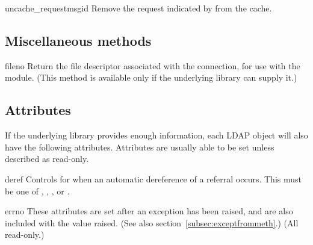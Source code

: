 
\begin{methoddesc}{uncache_request}{msgid}
Remove the request indicated by  from the cache.
\end{methoddesc}


\subsection{Miscellaneous methods}

\begin{methoddesc}{fileno}{}
Return the file descriptor associated with the connection, for use
with the  module.
(This method is available only if the underlying library can supply it.)
\end{methoddesc}


\subsection{Attributes}

If the underlying library provides enough information,
each LDAP object will also have the following attributes.
Attributes are usually able to be set unless described as read-only.


\begin{memberdesc}[int]{deref}
    Controls for when an automatic dereference of a referral occurs.
    This must be one of
    , , ,
    or .
\end{memberdesc}


\begin{memberdesc}[int]{errno}
    These attributes are set after an exception has been raised, and
    are also included with the value raised. 
    (See also section~\ref{subsec:exceptfrommeth}.)
    (All read-only.)
\end{memberdesc}

